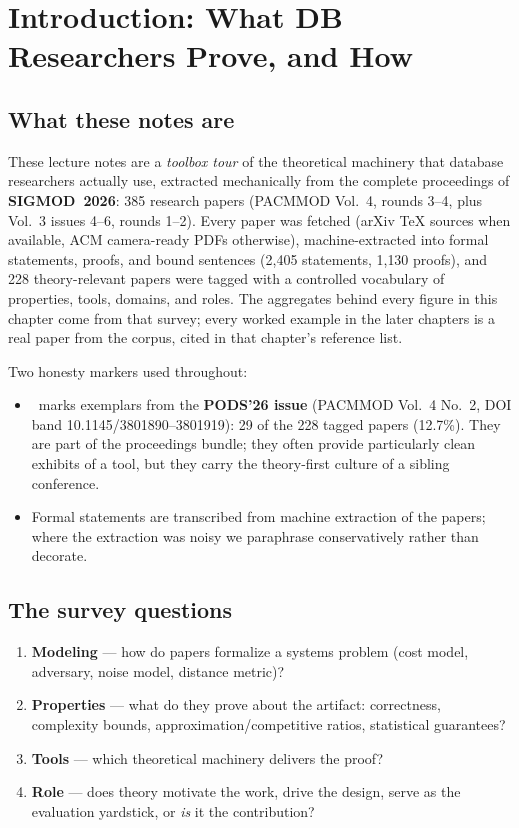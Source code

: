 \chapter{Introduction: What DB Researchers Prove, and How}
\setcounter{section}{-1}   %
\label{ch:intro}

\section{What these notes are}
These lecture notes are a \emph{toolbox tour} of the theoretical machinery that database
researchers actually use, extracted mechanically from the complete proceedings of
\textbf{SIGMOD~2026}: 385 research papers (PACMMOD Vol.~4, rounds 3--4, plus Vol.~3
issues 4--6, rounds 1--2). Every paper was fetched (arXiv \TeX{} sources when available,
ACM camera-ready PDFs otherwise), machine-extracted into formal statements, proofs, and
bound sentences (2{,}405 statements, 1{,}130 proofs), and 228 theory-relevant papers were
tagged with a controlled vocabulary of properties, tools, domains, and roles. The
aggregates behind every figure in this chapter come from that survey; every worked example
in the later chapters is a real paper from the corpus, cited in that chapter's reference
list.

Two honesty markers used throughout:
\begin{itemize}
\item \pods\ marks exemplars from the \textbf{PODS'26 issue} (PACMMOD Vol.~4 No.~2, DOI
  band 10.1145/3801890--3801919): 29 of the 228 tagged papers (12.7\%). They are part of
  the proceedings bundle; they often provide particularly clean exhibits of a tool, but
  they carry the theory-first culture of a sibling conference.
\item Formal statements are transcribed from machine extraction of the papers; where the
  extraction was noisy we paraphrase conservatively rather than decorate.
\end{itemize}

\section{The survey questions}
\begin{enumerate}
\item \textbf{Modeling} --- how do papers formalize a systems problem (cost model,
  adversary, noise model, distance metric)?
\item \textbf{Properties} --- what do they prove about the artifact: correctness,
  complexity bounds, approximation/competitive ratios, statistical guarantees?
\item \textbf{Tools} --- which theoretical machinery delivers the proof?
\item \textbf{Role} --- does theory motivate the work, drive the design, serve as the
  evaluation yardstick, or \emph{is} it the contribution?
\end{enumerate}

